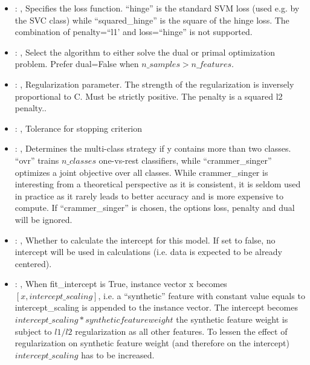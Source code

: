 \begin{itemize}
    \item {}: , 
      Specifies the loss function. ``hinge'' is the standard SVM loss (used e.g. by the SVC class)
      while ``squared\_hinge'' is the square of the hinge loss. The combination of penalty=``l1' and
      loss=``hinge''                                                  is not supported.

    \item {}: , 
      Select the algorithm to either solve the dual or primal optimization problem.
      Prefer dual=False when $n\_samples > n\_features$.

    \item {}: , 
      Regularization parameter. The strength of the regularization is inversely
      proportional to C.                                                            Must be strictly
      positive. The penalty is a squared l2 penalty..

    \item {}: , 
      Tolerance for stopping criterion

    \item {}: , 
      Determines the multi-class strategy if y contains more than two classes. ``ovr'' trains
      $n\_classes$ one-vs-rest classifiers, while ``crammer\_singer'' optimizes a joint objective over
      all classes.                                                  While crammer\_singer is
      interesting from a theoretical perspective as it is consistent, it is seldom used
      in practice as it rarely leads to better accuracy and is more expensive to compute. If
      ``crammer\_singer''                                                  is chosen, the options
      loss, penalty and dual will be ignored.

    \item {}: , 
      Whether to calculate the intercept for this model. If set to false, no
      intercept will be used in calculations (i.e. data is expected to be already centered).

    \item {}: , 
      When fit\_intercept is True, instance vector x becomes $[x, intercept\_scaling]$,
      i.e. a “synthetic” feature with constant value equals to intercept\_scaling is appended
      to the instance vector. The intercept becomes $intercept\_scaling * synthetic feature weight$
      \nb the synthetic feature weight is subject to $l1/l2$ regularization as all other features.
      To lessen the effect of regularization on synthetic feature weight (and therefore on the
      intercept)                                                  $intercept\_scaling$ has to be
      increased.


\end{itemize}
